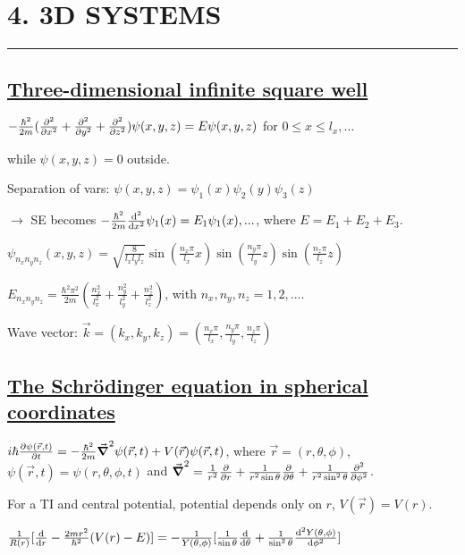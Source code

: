 \section{4. 3D SYSTEMS} \hrule height 0.3pt \thinspace

\subsection{\underline{Three-dimensional infinite square well}}

$-\frac{\hbar^2}{2m}(\pdv[2]{}{x} + \pdv[2]{}{y} + \pdv[2]{}{z}) \psi(x, y, z) = E \psi(x, y, z)$ for $0 \leq x \leq l_x, ...$

while $\psi(x, y, z) = 0$ outside.

Separation of vars: $\psi(x, y, z) = \psi_1(x) \psi_2(y) \psi_3(z)$

$\rightarrow$ SE becomes $-\frac{\hbar^2}{2m} \dv[2]{}{x} \psi_1(x) = E_1 \psi_1(x), ...$, where $E = E_1 + E_2 + E_3$.

$\psi_{n_x n_y n_z}(x, y, z) = \sqrt{\frac{8}{l_x l_y l_z}} \sin(\frac{n_x \pi}{l_x} x) \sin(\frac{n_y \pi}{l_y} z) \sin(\frac{n_z \pi}{l_z} z)$

$E_{n_x n_y n_z} = \frac{\hbar^2 \pi^2}{2m} (\frac{n^2_x}{l^2_x} + \frac{n^2_y}{l^2_y} + \frac{n^2_z}{l^2_z})$, with $n_x, n_y, n_z = 1, 2, ...$.

Wave vector: $\vec{k} = (k_x, k_y, k_z) = (\frac{n_x \pi}{l_x}, \frac{n_y \pi}{l_y}, \frac{n_z \pi}{l_z})$

\subsection{\underline{The Schr\"odinger equation in spherical coordinates}}

$i \hbar \pdv{\psi(\vec{r}, t)}{t} = -\frac{\hbar^2}{2m} \vec{\grad}^2 \psi(\vec{r}, t) + V(\vec{r})\psi(\vec{r}, t)$, where $\vec{r} = (r, \theta, \phi)$, $\psi(\vec{r}, t) = \psi(r, \theta, \phi, t)$ and $\vec{\grad}^2 = \frac{1}{r^2} \pdv{}{r}(r^2 \pdv{}{r}) + \frac{1}{r^2 \sin \theta} \pdv{}{\theta} (\sin \theta \pdv{}{\theta}) + \frac{1}{r^2 \sin^2 \theta} \pdv[2]{}{\phi}$.

For a TI and central potential, potential depends only on $r$, $V(\vec{r}) = V(r)$.

$\frac{1}{R(r)} [\dv{}{r} (r^2 \dv{R(r)}{r}) - \frac{2mr^2}{\hbar^2} (V(r) - E)] = -\frac{1}{Y(\theta, \phi)} [\frac{1}{\sin\theta} \dv{}{\theta} (\sin \theta \dv{Y(\theta, \phi)}{\theta}) + \frac{1}{\sin^2 \theta} \dv[2]{Y(\theta, \phi)}{\phi}]$

